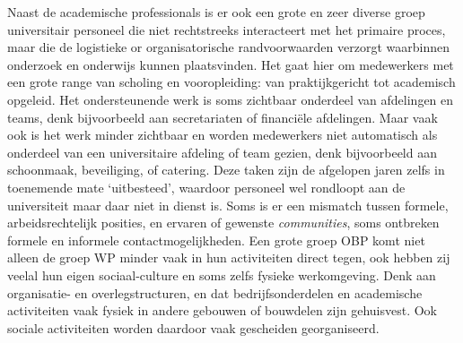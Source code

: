 \documentclass[smallauthor, chapterhaspagenum, nochapterinheader, pagenuminheader,  bigchapnum,medium2, tocpages,  garamond, titleinheader]{jote-book}
\begin{document}
	Naast de academische professionals is er ook een grote en zeer diverse groep universitair personeel die niet rechtstreeks interacteert met het primaire proces, maar die de logistieke or organisatorische randvoorwaarden verzorgt waarbinnen onderzoek en onderwijs kunnen plaatsvinden. Het gaat hier om medewerkers met een grote range van scholing en vooropleiding: van praktijkgericht tot academisch opgeleid. Het ondersteunende werk is soms zichtbaar onderdeel van afdelingen en teams, denk bijvoorbeeld aan secretariaten of financiële afdelingen. Maar vaak ook is het werk minder zichtbaar en worden medewerkers niet automatisch als onderdeel van een universitaire afdeling of team gezien, denk bijvoorbeeld aan schoonmaak, beveiliging, of catering. Deze taken zijn de afgelopen jaren zelfs in toenemende mate ‘uitbesteed', waardoor personeel wel rondloopt aan de universiteit maar daar niet in dienst is. Soms is er een mismatch tussen formele, arbeidsrechtelijk posities, en ervaren of gewenste \emph{communities}, soms ontbreken formele en informele contactmogelijkheden. Een grote groep OBP komt niet alleen de groep WP minder vaak in hun activiteiten direct tegen, ook hebben zij veelal hun eigen sociaal-culture en soms zelfs fysieke werkomgeving. Denk aan organisatie- en overlegstructuren, en dat bedrijfsonderdelen en academische activiteiten vaak fysiek in andere gebouwen of bouwdelen zijn gehuisvest. Ook sociale activiteiten worden daardoor vaak gescheiden georganiseerd.
\end{document}
